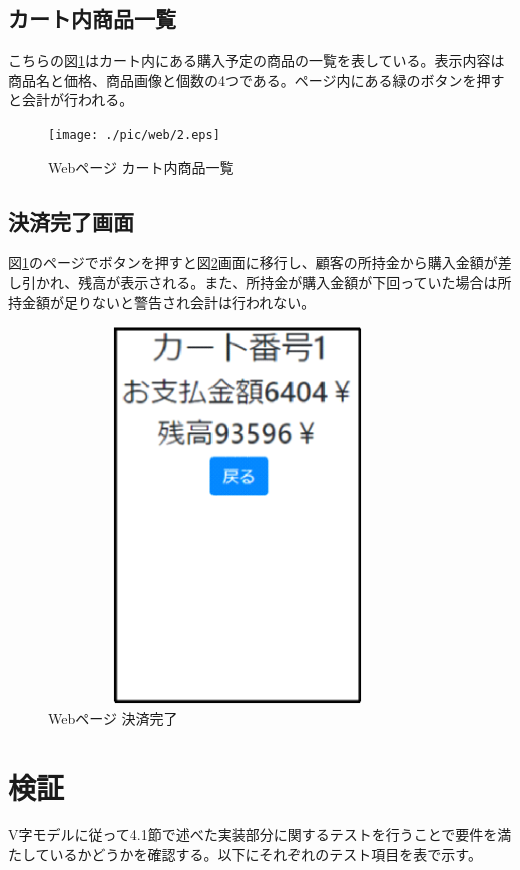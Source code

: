 \subsection*{カート内商品一覧}
こちらの図\ref{web_cart_items}はカート内にある購入予定の商品の一覧を表している。表示内容は商品名と価格、商品画像と個数の4つである。ページ内にある緑のボタンを押すと会計が行われる。
\begin{figure}[htbp]
\centering
\texttt{[image: ./pic/web/2.eps]}
\caption{Webページ カート内商品一覧}
\label{web_cart_items}
\end{figure}

\subsection*{決済完了画面}
図\ref{web_cart_items}のページでボタンを押すと図\ref{web_checksum}画面に移行し、顧客の所持金から購入金額が差し引かれ、残高が表示される。また、所持金が購入金額が下回っていた場合は所持金額が足りないと警告され会計は行われない。
\begin{figure}[htbp]
\centering
\includegraphics[width=10cm,height=10cm]{./pic/web/3.eps}
\caption{Webページ 決済完了}
\label{web_checksum}
\end{figure}

\newpage

\section{検証}
V字モデルに従って4.1節で述べた実装部分に関するテストを行うことで要件を満たしているかどうかを確認する。以下にそれぞれのテスト項目を表で示す。

